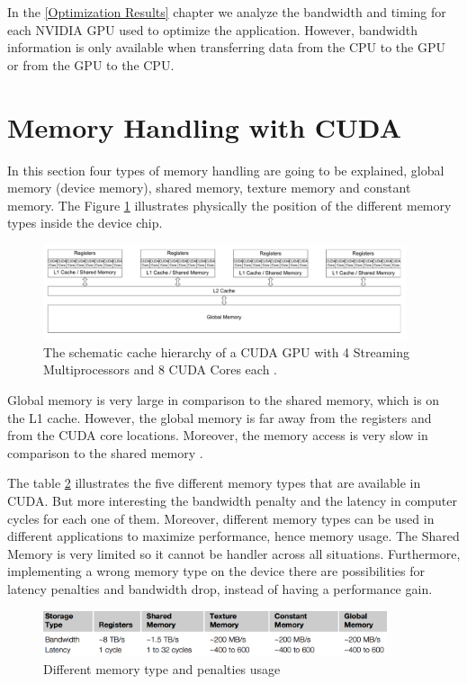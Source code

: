  In the \ref{Optimization Results} chapter we analyze the bandwidth and timing for each NVIDIA GPU used to optimize the application. However, bandwidth information is only available when transferring data from the CPU to the GPU or from the GPU to the CPU.

\section{Memory Handling with CUDA}

In this section four types of memory handling are going to be explained, global memory (device memory), shared memory, texture memory and constant memory. The Figure \ref{fig:cores} illustrates physically the position of the different memory types inside the device chip.

\begin{figure}[htbp]
	\centering
		\includegraphics[width=0.95\textwidth]{Figures/cores.png}
		\smallskip
	\caption[Schematic cache hierarchy of a CUDA GPU]{The schematic cache hierarchy of a CUDA GPU with 4 Streaming Multiprocessors and 8 CUDA Cores each \cite{cook}.}
	\label{fig:cores}
\end{figure}

Global memory is very large in comparison to the shared memory, which is on the L1 cache. However, the global memory is far away from the registers and from the CUDA core locations. Moreover, the memory access is very slow in comparison to the shared memory \cite{cook}.

The table \ref{fig:memory} illustrates the five different memory types that are available in CUDA. But more interesting the bandwidth penalty and the latency in computer cycles for each one of them. Moreover, different memory types can be used in different applications to maximize performance, hence memory usage. The Shared Memory is very limited so it cannot be handler across all situations. Furthermore, implementing a wrong memory type on the device there are possibilities for latency penalties and bandwidth drop, instead of having a performance gain.
 
\begin{figure}[htbp]
	\centering
		\includegraphics[width=0.9\textwidth]{Figures/memory.png}
		\smallskip
	\caption[Different memory types]{Different memory type and penalties usage \cite{cook}}
	\label{fig:memory}
\end{figure}

